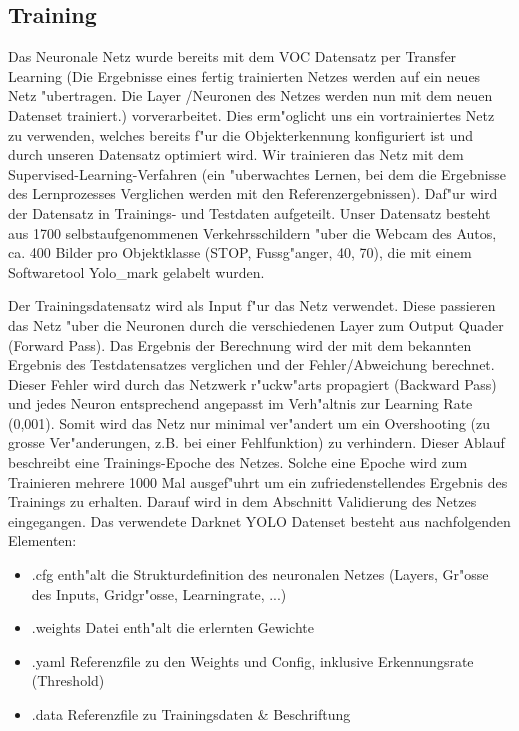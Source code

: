 \subsection{Training}

Das Neuronale Netz wurde bereits mit dem VOC Datensatz per Transfer Learning (Die Ergebnisse eines fertig trainierten Netzes werden auf ein neues Netz "ubertragen. Die Layer /Neuronen des Netzes werden nun mit dem neuen Datenset trainiert.) vorverarbeitet. Dies erm"oglicht uns ein vortrainiertes Netz zu verwenden, welches bereits f"ur die Objekterkennung konfiguriert ist und durch unseren Datensatz optimiert wird. Wir trainieren das Netz mit dem Supervised-Learning-Verfahren (ein "uberwachtes Lernen, bei dem die Ergebnisse des Lernprozesses Verglichen werden mit den Referenzergebnissen).  Daf"ur wird der Datensatz in Trainings- und Testdaten aufgeteilt. Unser Datensatz besteht aus 1700 selbstaufgenommenen Verkehrsschildern "uber die Webcam des Autos, ca. 400 Bilder pro Objektklasse (STOP, Fussg"anger, 40, 70), die mit einem Softwaretool Yolo\_mark \cite{Yolo_mark} gelabelt wurden.

Der Trainingsdatensatz wird als Input f"ur das Netz verwendet. Diese passieren das Netz "uber die Neuronen durch die verschiedenen Layer zum Output Quader (Forward Pass). Das Ergebnis der Berechnung wird der mit dem bekannten Ergebnis des Testdatensatzes verglichen und der Fehler/Abweichung berechnet. Dieser Fehler wird durch das Netzwerk r"uckw"arts propagiert (Backward Pass) und jedes Neuron entsprechend angepasst im Verh"altnis zur Learning Rate (0,001). Somit wird das Netz nur minimal ver"andert um ein Overshooting (zu grosse Ver"anderungen, z.B. bei einer Fehlfunktion) zu verhindern. Dieser Ablauf beschreibt eine Trainings-Epoche des Netzes.  Solche eine Epoche wird zum Trainieren mehrere 1000 Mal ausgef"uhrt um ein zufriedenstellendes Ergebnis des Trainings zu erhalten. Darauf wird in dem Abschnitt Validierung des Netzes eingegangen. Das verwendete Darknet YOLO Datenset besteht aus nachfolgenden Elementen:

\begin{itemize}
	\item .cfg enth"alt die Strukturdefinition des neuronalen Netzes (Layers, Gr"osse des Inputs, Gridgr"osse, Learningrate, ...)
	\item .weights Datei enth"alt die erlernten Gewichte
	\item .yaml Referenzfile zu den Weights und Config, inklusive Erkennungsrate (Threshold)
	\item .data Referenzfile zu Trainingsdaten \& Beschriftung
\end{itemize}

